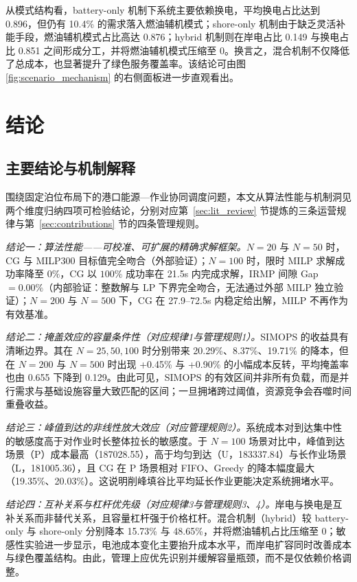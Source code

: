 \documentclass[UTF8, a4paper, 12pt]{ctexart}
\theoremstyle{plain}
\theoremstyle{definition}
\theoremstyle{remark}
\begin{document}
从模式结构看，battery-only 机制下系统主要依赖换电，平均换电占比达到 0.896，但仍有 10.4\% 的需求落入燃油辅机模式；shore-only 机制由于缺乏灵活补能手段，燃油辅机模式占比高达 0.876；hybrid 机制则在岸电占比 0.149 与换电占比 0.851 之间形成分工，并将燃油辅机模式压缩至 0。换言之，混合机制不仅降低了总成本，也显著提升了绿色服务覆盖率。该结论可由图 \ref{fig:scenario_mechanism} 的右侧面板进一步直观看出。


\section{结论}
\label{sec:conclusion}

\subsection{主要结论与机制解释}
\label{sec:main_findings}

围绕固定泊位布局下的港口能源—作业协同调度问题，本文从算法性能与机制洞见两个维度归纳四项可检验结论，分别对应第~\ref{sec:lit_review} 节提炼的三条运营规律与第~\ref{sec:contributions} 节的四条管理规则。

\emph{结论一：算法性能——可校准、可扩展的精确求解框架。}$N=20$ 与 $N=50$ 时，CG 与 MILP300 目标值完全吻合（外部验证）；$N=100$ 时，限时 MILP 求解成功率降至 $0\%$，CG 以 $100\%$ 成功率在 21.5s 内完成求解，IRMP 间隙 Gap $= 0.00\%$（内部验证：整数解与 LP 下界完全吻合，无法通过外部 MILP 独立验证）；$N=200$ 与 $N=500$ 下，CG 在 27.9--72.5s 内稳定给出解，MILP 不再作为有效基准。

\emph{结论二：掩盖效应的容量条件性（对应规律1与管理规则1）。}SIMOPS 的收益具有清晰边界。其在 $N=25,50,100$ 时分别带来 20.29\%、8.37\%、19.71\% 的降本，但在 $N=200$ 与 $N=500$ 时出现 +0.45\% 与 +0.90\% 的小幅成本反转，平均掩盖率也由 0.655 下降到 0.129。由此可见，SIMOPS 的有效区间并非所有负载，而是并行需求与基础设施容量大致匹配的区间；一旦拥堵跨过阈值，资源竞争会吞噬时间重叠收益。

\emph{结论三：峰值到达的非线性放大效应（对应管理规则2）。}系统成本对到达集中性的敏感度高于对作业时长整体拉长的敏感度。于 $N=100$ 场景对比中，峰值到达场景（P）成本最高（187028.55），高于均匀到达（U，183337.84）与长作业场景（L，181005.36），且 CG 在 P 场景相对 FIFO、Greedy 的降本幅度最大（19.35\%、20.03\%）。这说明削峰填谷比平均延长作业更能决定系统拥堵水平。

\emph{结论四：互补关系与杠杆优先级（对应规律3与管理规则3、4）。}岸电与换电是互补关系而非替代关系，且容量杠杆强于价格杠杆。混合机制（hybrid）较 battery-only 与 shore-only 分别降本 15.73\% 与 48.65\%，并将燃油辅机占比压缩至 0；敏感性实验进一步显示，电池成本变化主要抬升成本水平，而岸电扩容同时改善成本与绿色覆盖结构。由此，管理上应优先识别并缓解容量瓶颈，而不是仅依赖价格调整。
\end{document}
